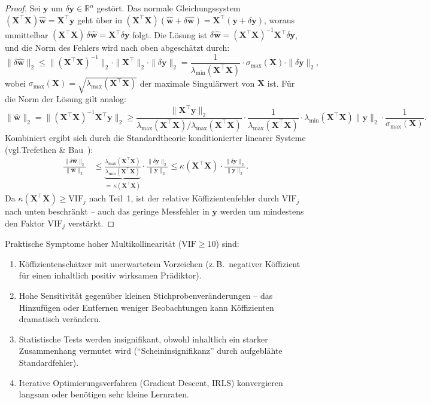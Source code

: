﻿\documentclass[12pt, a4paper]{article}
\theoremstyle{definition}
\theoremstyle{remark}
\newcommand{\R}{\mathbb{R}}
\newcommand{\vw}{\bm{w}}
\newcommand{\vy}{\bm{y}}
\newcommand{\vX}{\bm{X}}
\newcommand{\T}{\top}
\begin{document}
\begin{proof}
	Sei $\vy$ um $\delta\vy \in \R^n$ gestört. Das normale Gleichungssystem
	$(\vX^\T\vX)\hat{\vw} = \vX^\T\vy$ geht über in
	$(\vX^\T\vX)(\hat{\vw}+\delta\hat{\vw}) = \vX^\T(\vy+\delta\vy)$,
	woraus unmittelbar $(\vX^\T\vX)\,\delta\hat{\vw} = \vX^\T\delta\vy$ folgt. Die Lösung
	ist $\delta\hat{\vw} = (\vX^\T\vX)^{-1}\vX^\T\delta\vy$, und die Norm des Fehlers wird
	nach oben abgeschätzt durch:
	\[
	\|\delta\hat{\vw}\|_2
	\leq \bigl\|(\vX^\T\vX)^{-1}\bigr\|_2 \cdot \|\vX^\T\|_2 \cdot \|\delta\vy\|_2
	= \frac{1}{\lambda_{\min}(\vX^\T\vX)} \cdot \sigma_{\max}(\vX) \cdot \|\delta\vy\|_2,
	\]
	wobei $\sigma_{\max}(\vX) = \sqrt{\lambda_{\max}(\vX^\T\vX)}$ der maximale Singulärwert
	von $\vX$ ist. Für die Norm der Lösung gilt analog:
	\[
	\|\hat{\vw}\|_2 = \bigl\|(\vX^\T\vX)^{-1}\vX^\T\vy\bigr\|_2
	\geq \frac{\|\vX^\T\vy\|_2}{\lambda_{\max}(\vX^\T\vX)/\lambda_{\max}(\vX^\T\vX)} \cdot \frac{1}{\lambda_{\max}(\vX^\T\vX)} \cdot \lambda_{\min}(\vX^\T\vX)\|\vy\|_2 \cdot \frac{1}{\sigma_{\max}(\vX)}.
	\]
	Kombiniert ergibt sich durch die Standardtheorie konditionierter linearer Systeme
	(vgl.\@ Trefethen \& Bau~\cite{trefethen1997numerical}):
	\begin{align*}
		\frac{\|\delta\hat{\vw}\|_2}{\|\hat{\vw}\|_2}
		&\leq \underbrace{\frac{\lambda_{\max}(\vX^\T\vX)}{\lambda_{\min}(\vX^\T\vX)}}_{=\,\kappa(\vX^\T\vX)}
		\cdot \frac{\|\delta\vy\|_2}{\|\vy\|_2}
		\leq \kappa(\vX^\T\vX) \cdot \frac{\|\delta\vy\|_2}{\|\vy\|_2}.
	\end{align*}
	Da $\kappa(\vX^\T\vX) \geq \mathrm{VIF}_j$ nach Teil~1, ist der relative
	Köffizientenfehler durch $\mathrm{VIF}_j$ nach unten beschränkt -- auch das geringe
	Messfehler in $\vy$ werden um mindestens den Faktor $\mathrm{VIF}_j$ verstärkt.
\end{proof}

Praktische Symptome hoher Multikollinearität ($\mathrm{VIF} \geq 10$) sind:
\begin{enumerate}[label=(\roman*)]
	\item Köffizientenschätzer mit unerwartetem Vorzeichen (z.\,B.\ negativer Köffizient
	für einen inhaltlich positiv wirksamen Prädiktor).
	\item Hohe Sensitivität gegenüber kleinen Stichprobenveränderungen -- das Hinzufügen
	oder Entfernen weniger Beobachtungen kann Köffizienten dramatisch verändern.
	\item Statistische Tests werden insignifikant, obwohl inhaltlich ein starker Zusammenhang
	vermutet wird (``Scheininsignifikanz'' durch aufgeblähte Standardfehler).
	\item Iterative Optimierungsverfahren (Gradient Descent, IRLS) konvergieren langsam
	oder benötigen sehr kleine Lernraten.
\end{enumerate}
\end{document}
